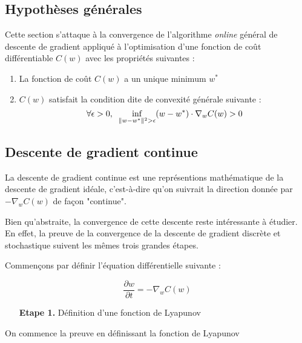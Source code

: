 \documentclass{article}
\begin{document}
\subsection{Hypothèses générales}

Cette section s'attaque à la convergence de l'algorithme \emph{online} général de descente de gradient appliqué à l'optimisation d'une fonction de coût différentiable $C(w)$ avec les propriétés suivantes :

\begin{enumerate}
    \item La fonction de coût $C(w)$ a un unique minimum $w^*$
    \item $C(w)$ satisfait la condition dite de convexité générale suivante :
    \begin{equation} \label{eq(4.1)}
        \forall \epsilon > 0, \hspace{0.2cm} \underset{\lVert w - w^* \rVert^2 > \epsilon}{\inf} (w - w^*) \cdot \nabla_wC(w) > 0 
    \end{equation}
\end{enumerate}

\subsection{Descente de gradient continue}

La descente de gradient continue est une représentions mathématique de la descente de gradient idéale, c'est-à-dire qu'on suivrait la direction donnée par $-\nabla_wC(w)$ de façon "continue".
\bigskip

Bien qu'abstraite, la convergence de cette descente reste intéressante à étudier. En effet, la preuve de la convergence de la descente de gradient discrète et stochastique suivent les mêmes trois grandes étapes.
\bigskip 

Commençons par définir l'équation différentielle suivante :

\begin{equation} \label{edo}
    \frac{\partial w}{\partial t} = -\nabla_wC(w)
\end{equation}
\bigskip

\begin{itemize} 
    \item[\textbf{Etape 1.}] Définition d'une fonction de Lyapunov
\end{itemize}
\bigskip
    
On commence la preuve en définissant la fonction de Lyapunov 
\end{document}
